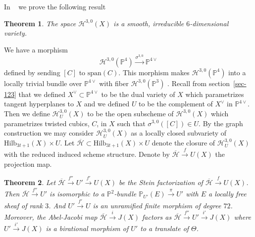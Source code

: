 \documentclass[amssymb,twoside,12 pt,amscd,reqno]{amsart}
\theoremstyle{plain}
\newtheorem{thm}{Theorem}[section]
\theoremstyle{definition}
\newcommand{\Hdg}[2]{\mathcal{H}^{#1,#2}}
\newcommand{\PP}{\mathbb{P}}
\newcommand{\HI}[2]{\text{Hilb}_{#1}(#2)}
\def\ps{\vspace{4pt}}
\begin{document}
\ps

In ~\cite[theorem 4.4]{HRS1} we prove the following result

\begin{thm}\label{thm-irr30} 
The space $\Hdg{3}{0}(X)$ is a smooth,
irreducible $6$-dimensional variety.
\end{thm}

We have a morphism 
\begin{equation}
\Hdg{3}{0}(\PP^4)\xrightarrow{\sigma^{3,0}} \PP^{4\vee}
\end{equation}
defined by sending $[C]$ to $\text{span}(C)$.
This morphism makes $\Hdg{3}{0}(\PP^4)$ 
into a locally trivial bundle over $\PP^{4\vee}$ with fiber
$\Hdg{3}{0}(\PP^3)$ .  Recall from section~\ref{sec-123} that we defined
$X^\vee
\subset \PP^{4\vee}$ to be the dual variety of $X$ which parametrizes
tangent hyperplanes to $X$ and we defined $U$ to
be the complement of $X^\vee$ in $\PP^{4\vee}$.  Then we define 
$\Hdg{3}{0}_U(X)$ to be the
open subscheme of $\Hdg{3}{0}(X)$ which parametrizes twisted cubics,
$C$, in $X$ 
such that $\sigma^{3,0}([C])\in U$.  By the graph construction we may
consider $\Hdg{3}{0}_U(X)$ as a locally closed subvariety of
$\HI{3t+1}{X}\times U$.  
Let $\overline{\mathcal{H}}\subset \HI{3t+1}{X}\times U$ denote the
closure of $\Hdg{3}{0}_U(X)$ with the reduced induced scheme structure.
Denote by $\overline{\mathcal{H}} \xrightarrow{f} U(X)$ the projection map. 

\begin{thm}\label{thm-st30}  
Let
$\overline{\mathcal{H}}\xrightarrow{f''} U'\xrightarrow{f'} 
U(X)$ 
be the Stein factorization of $\overline{\mathcal{H}}\xrightarrow{f} U(X)$.
Then 
$\overline{\mathcal{H}}\xrightarrow{f''} U'$ is isomorphic to a $\PP^2$-bundle
$\PP_{U'}(E)\xrightarrow{\pi} U'$ with $E$ a locally free sheaf of rank $3$.
And $U'\xrightarrow{f'} U$ is an unramified finite morphism of degree
$72$.  Moreover, the Abel-Jacobi map $\overline{\mathcal{H}}\xrightarrow{i}
J(X)$ 
factors as $\overline{\mathcal{H}}\xrightarrow{f''} U'\xrightarrow{i'}
J(X)$ where 
$U'\xrightarrow{i'} J(X)$ is a birational morphism of $U'$ to a translate
of $\Theta$.
\end{thm} 
\end{document}
